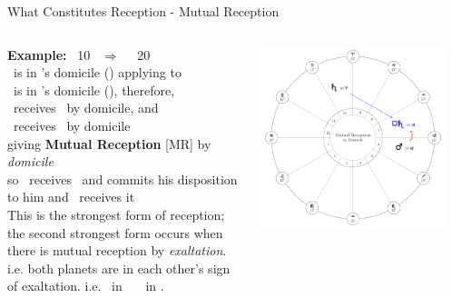 \begin{frame}[t]{What Constitutes Reception - Mutual Reception}
\begin{columns}[T, onlytextwidth]
\textbf{Example:} \Mars\ 10 \Capricorn\ $\Rightarrow$ \Square\ \Saturn\ 20 \Aries \\
\ul
\vspace{0.5cm}
\Mars\ is in \Saturn's domicile (\Capricorn) applying to \Square\ \Saturn \\
\Saturn\ is in \Mars's domicile (\Aries), therefore, \\
\Mars\ receives \Saturn\ by domicile, and \\
\Saturn\ receives \Mars\ by domicile \\
\vspace{0.25cm}
giving  \textbf{Mutual Reception} [MR] by \textsl{domicile} \\
so \Mars\ receives \Saturn\ and commits his disposition to him and \Saturn\ receives it \\
\vspace{0.25cm}
This is the strongest form of reception; the second strongest form occurs when there is mutual reception by \textsl{exaltation}. i.e. both planets are in each other's sign of exaltation. i.e. \Venus\ in \Cancer\ \Trine\ \Jupiter\ in \Pisces.


\begin{center}
{\includegraphics[width=0.9\textwidth]{charts/01-MR-by-domicile}} \\
\end{center}

\end{columns}
\end{frame}
